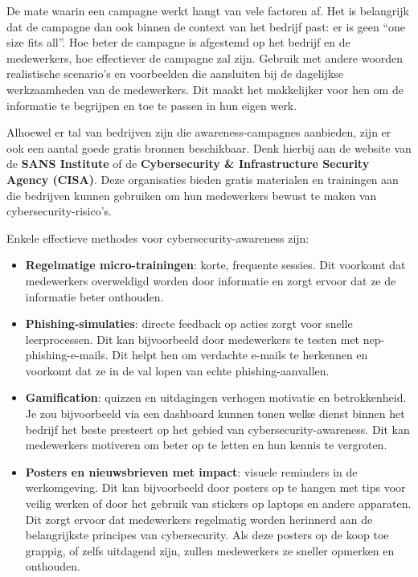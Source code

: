 \documentclass[
  10pt,
  dutch,
  paper=a4,
  ,captions=tableheading
]{scrbook}
\providecommand{\tightlist}{%
  \setlength{\itemsep}{0pt}\setlength{\parskip}{0pt}}
\begin{document}
De mate waarin een campagne werkt hangt van vele factoren af. Het is
belangrijk dat de campagne dan ook binnen de context van het bedrijf
past: er is geen ``one size fits all''. Hoe beter de campagne is
afgestemd op het bedrijf en de medewerkers, hoe effectiever de campagne
zal zijn. Gebruik met andere woorden realistische scenario's en
voorbeelden die aansluiten bij de dagelijkse werkzaamheden van de
medewerkers. Dit maakt het makkelijker voor hen om de informatie te
begrijpen en toe te passen in hun eigen werk.

Alhoewel er tal van bedrijven zijn die awareness-campagnes aanbieden,
zijn er ook een aantal goede gratis bronnen beschikbaar. Denk hierbij
aan de website van de \textbf{SANS Institute} of de
\textbf{Cybersecurity \& Infrastructure Security Agency (CISA)}. Deze
organisaties bieden gratis materialen en trainingen aan die bedrijven
kunnen gebruiken om hun medewerkers bewust te maken van
cybersecurity-risico's.

Enkele effectieve methodes voor cybersecurity-awareness zijn:

\begin{itemize}
\tightlist
\item
  \textbf{Regelmatige micro-trainingen}: korte, frequente sessies. Dit
  voorkomt dat medewerkers overweldigd worden door informatie en zorgt
  ervoor dat ze de informatie beter onthouden.
\item
  \textbf{Phishing-simulaties}: directe feedback op acties zorgt voor
  snelle leerprocessen. Dit kan bijvoorbeeld door medewerkers te testen
  met nep-phishing-e-mails. Dit helpt hen om verdachte e-mails te
  herkennen en voorkomt dat ze in de val lopen van echte
  phishing-aanvallen.
\item
  \textbf{Gamification}: quizzen en uitdagingen verhogen motivatie en
  betrokkenheid. Je zou bijvoorbeeld via een dashboard kunnen tonen
  welke dienst binnen het bedrijf het beste presteert op het gebied van
  cybersecurity-awareness. Dit kan medewerkers motiveren om beter op te
  letten en hun kennis te vergroten.
\item
  \textbf{Posters en nieuwsbrieven met impact}: visuele reminders in de
  werkomgeving. Dit kan bijvoorbeeld door posters op te hangen met tips
  voor veilig werken of door het gebruik van stickers op laptops en
  andere apparaten. Dit zorgt ervoor dat medewerkers regelmatig worden
  herinnerd aan de belangrijkste principes van cybersecurity. Als deze
  posters op de koop toe grappig, of zelfs uitdagend zijn, zullen
  medewerkers ze sneller opmerken en onthouden.
\end{itemize}
\end{document}
